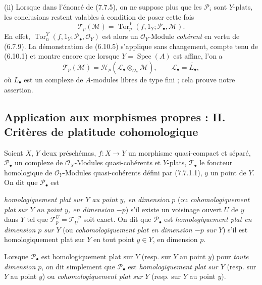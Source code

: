 \begin{remarks}[7.7.12]
\medskip
\textnormal{(ii)} Lorsque dans l'énoncé de (7.7.5), on ne suppose plus que les
$\mathscr P_i$ sont $Y$-plats, les conclusions restent valables à condition de
poser cette fois
\[
  \mathscr T_p(\mathscr M)
  =
  \operatorname{Tor}^Y_p
    (f,1_Y;\mathscr P_\bullet,\mathscr M).
  \tag{7.7.12.1}\label{III.7.7.12.1.fr}
\]
En effet, $\operatorname{Tor}^Y_n(f,1_Y;\mathscr P_\bullet,\mathscr O_Y)$ est
alors un $\mathscr O_Y$-Module \emph{cohérent} en vertu de (6.7.9). La
démonstration de (6.10.5) s'applique sans changement, compte tenu de (6.10.1)
et montre encore que lorsque $Y=\operatorname{Spec}(A)$ est affine, l'on a
\[
  \mathscr T_p(\mathscr M)
  =
  \mathscr H_p(\mathscr L_\bullet\otimes_{\mathscr O_Y}\mathscr M),
  \qquad
  \mathscr L_\bullet=\widetilde{L_\bullet},
\]
où $L_\bullet$ est un complexe de $A$-modules libres de type fini ; cela prouve
notre assertion.
\end{remarks}

\subsection{Application aux morphismes propres : II. Critères de platitude
cohomologique}
\label{subsection:III.7.8.fr}

\begin{definition}[7.8.1]
Soient $X$, $Y$ deux préschémas, $f:X\to Y$ un morphisme quasi-compact et
séparé, $\mathscr P_\bullet$ un complexe de $\mathscr O_X$-Modules
quasi-cohérents et $Y$-plats, $\mathscr T_\bullet$ le foncteur homologique de
$\mathscr O_Y$-Modules quasi-cohérents défini par (7.7.1.1), $y$ un point de $Y$.
On dit que $\mathscr P_\bullet$ est

\emph{homologiquement plat sur $Y$ au point $y$, en dimension $p$} (ou
\emph{cohomologiquement plat sur $Y$ au point $y$, en dimension $-p$}) s'il
existe un voisinage ouvert $U$ de $y$ dans $Y$ tel que
$\mathscr T_p^U=\mathscr T_U^{-p}$ soit exact. On dit que $\mathscr P_\bullet$ est
\emph{homologiquement plat en dimension $p$ sur $Y$} (ou
\emph{cohomologiquement plat en dimension $-p$ sur $Y$}) s'il est
homologiquement plat sur $Y$ en tout point $y\in Y$, en dimension $p$.

Lorsque $\mathscr P_\bullet$ est homologiquement plat sur $Y$ (resp. sur $Y$ au
point $y$) pour \emph{toute dimension $p$}, on dit simplement que
$\mathscr P_\bullet$ est \emph{homologiquement plat sur $Y$} (resp. sur $Y$ au
point $y$) ou \emph{cohomologiquement plat sur $Y$} (resp. sur $Y$ au point
$y$).
\end{definition}

